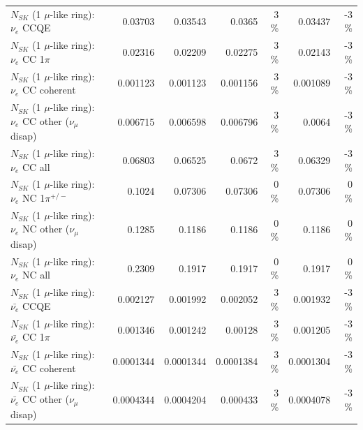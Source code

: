 \begin{table}
\begin{tabular}{| l | r | r | r  r | r  r |}
\hline
\hline
\hline
                                      $N_{SK}$ (1 $\mu$-like ring): $\nu_e$ CCQE &         0.03703 &         0.03543 &          0.0365 &        3 \%  &         0.03437 &       -3 \%  \\ 
                                 $N_{SK}$ (1 $\mu$-like ring): $\nu_e$ CC 1$\pi$ &         0.02316 &         0.02209 &         0.02275 &        3 \%  &         0.02143 &       -3 \%  \\ 
                               $N_{SK}$ (1 $\mu$-like ring): $\nu_e$ CC coherent &        0.001123 &        0.001123 &        0.001156 &        3 \%  &        0.001089 &       -3 \%  \\ 
                $N_{SK}$ (1 $\mu$-like ring): $\nu_e$ CC other ($\nu_\mu$ disap) &        0.006715 &        0.006598 &        0.006796 &        3 \%  &          0.0064 &       -3 \%  \\ 
                                  $N_{SK}$ (1 $\mu$-like ring): $\nu_{e}$ CC all &         0.06803 &         0.06525 &          0.0672 &        3 \%  &         0.06329 &       -3 \%  \\ 
\hline
                           $N_{SK}$ (1 $\mu$-like ring): $\nu_e$ NC 1$\pi^{+/-}$ &          0.1024 &         0.07306 &         0.07306 &        0 \%  &         0.07306 &        0 \%  \\ 
                $N_{SK}$ (1 $\mu$-like ring): $\nu_e$ NC other ($\nu_\mu$ disap) &          0.1285 &          0.1186 &          0.1186 &        0 \%  &          0.1186 &        0 \%  \\ 
                                  $N_{SK}$ (1 $\mu$-like ring): $\nu_{e}$ NC all &          0.2309 &          0.1917 &          0.1917 &        0 \%  &          0.1917 &        0 \%  \\ 
\hline
\hline
\hline
                                $N_{SK}$ (1 $\mu$-like ring): $\bar{\nu_e}$ CCQE &        0.002127 &        0.001992 &        0.002052 &        3 \%  &        0.001932 &       -3 \%  \\ 
                           $N_{SK}$ (1 $\mu$-like ring): $\bar{\nu_e}$ CC 1$\pi$ &        0.001346 &        0.001242 &         0.00128 &        3 \%  &        0.001205 &       -3 \%  \\ 
                         $N_{SK}$ (1 $\mu$-like ring): $\bar{\nu_e}$ CC coherent &       0.0001344 &       0.0001344 &       0.0001384 &        3 \%  &       0.0001304 &       -3 \%  \\ 
          $N_{SK}$ (1 $\mu$-like ring): $\bar{\nu_e}$ CC other ($\nu_\mu$ disap) &       0.0004344 &       0.0004204 &        0.000433 &        3 \%  &       0.0004078 &       -3 \%  \\ 

\end{tabular}
\end{table}
